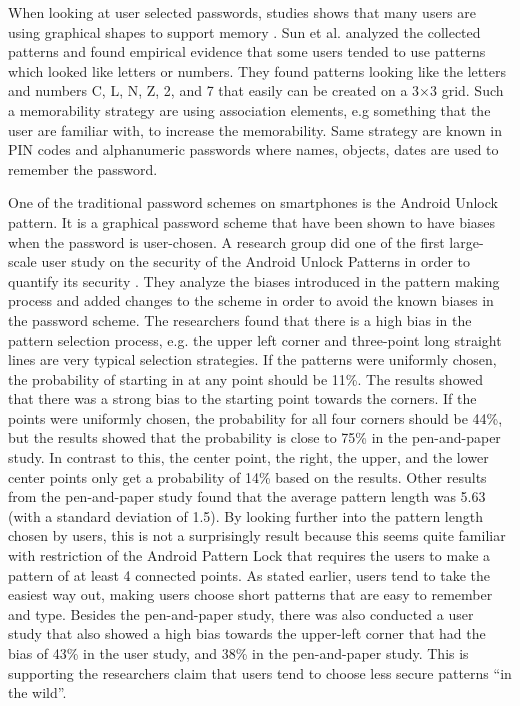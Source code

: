   When looking at user selected passwords, studies shows that many users are using graphical shapes to support memory \cite{Weiss}. Sun et al. \cite{Sun} analyzed the collected patterns and found empirical evidence that some users tended to use patterns which looked like letters or numbers. They found patterns looking like the letters and numbers C, L, N, Z, 2, and 7 that easily can be created on a 3$\times$3 grid. Such a memorability strategy are using association elements, e.g something that the user are familiar with, to increase the memorability. Same strategy are known in PIN codes and alphanumeric passwords where names, objects, dates are used to remember the password.

  One of the traditional password schemes on smartphones is the Android Unlock pattern. It is a graphical password scheme that have been shown to have biases when the password is user-chosen. A research group did one of the first large-scale user study on the security of the Android Unlock Patterns in order to quantify its security \cite{Uellenbeck}. They analyze the biases introduced in the pattern making process and added changes to the scheme in order to avoid the known biases in the password scheme. The researchers found that there is a high bias in the pattern selection process, e.g. the upper left corner and three-point long straight lines are very typical selection strategies. If the patterns were uniformly chosen, the probability of starting in at any point should be 11\%. The results showed that there was a strong bias to the starting point towards the corners. If the points were uniformly chosen, the probability for all four corners should be 44\%, but the results showed that the probability is close to 75\% in the pen-and-paper study. In contrast to this, the center point, the right, the upper, and the lower center points only get a probability of 14\% based on the results. Other results from the pen-and-paper study found that the average pattern length was 5.63 (with a standard deviation of 1.5). By looking further into the pattern length chosen by users, this is not a surprisingly result because this seems quite familiar with restriction of the Android Pattern Lock that requires the users to make a pattern of at least 4 connected points. As stated earlier, users tend to take the easiest way out, making users choose short patterns that are easy to remember and type. Besides the pen-and-paper study, there was also conducted a user study that also showed a high bias towards the upper-left corner that had the bias of 43\% in the user study, and 38\% in the pen-and-paper study. This is supporting the researchers claim that users tend to choose less secure patterns ``in the wild''.

